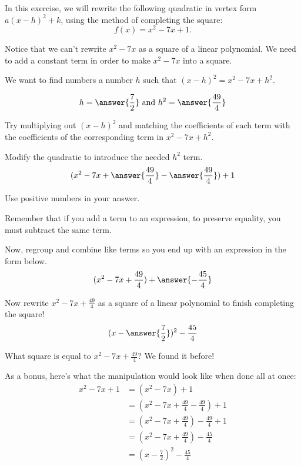 \documentclass{ximera}
\author{Kenneth Berglund}
\begin{document}
In this exercise, we will rewrite the following quadratic in vertex form $a(x - h)^2 + k$, using the method of completing the square:
\[
f(x)=x^2-7x+1.
\]

\begin{exercise}

Notice that we can't rewrite $x^2 - 7x$ as a square of a linear polynomial. We need to add a constant term in order to make $x^2 - 7x$ into a square. 

We want to find numbers a number $h$ such that $(x - h)^2 = x^2 - 7x + h^2$. 

$$
h = \answer{\frac{7}{2}} \text{ and } h^2 = \answer{\frac{49}{4}}
$$
\begin{hint}
Try multiplying out $(x - h)^2$ and matching the coefficients of each term with the coefficients of the corresponding term in $x^2 - 7x + h^2$. 
\end{hint}


\begin{exercise}
Modify the quadratic to introduce the needed $h^2$ term.
$$
(x^2 - 7x + \answer{\frac{49}{4}} - \answer{\frac{49}{4}}) + 1
$$ 

Use positive numbers in your answer.

\begin{hint}
Remember that if you add a term to an expression, to preserve equality, you must subtract the same term.
\end{hint}

\begin{exercise}
Now, regroup and combine like terms so you end up with an expression in the form below.
$$
(x^2-7x+\frac{49}{4}) + \answer{-\frac{45}{4}}
$$ 

\begin{exercise}
Now rewrite $x^2 - 7x + \frac{49}{4}$ as a square of a linear polynomial to finish completing the square!
$$
(x - \answer{\frac{7}{2}})^2 -\frac{45}{4}
$$ 
\begin{hint}
What square is equal to $x^2 - 7x + \frac{49}{4}$? We found it before!
\end{hint}

\begin{exercise}
As a bonus, here's what the manipulation would look like when done all at once:
\begin{align*}
x^2 - 7x + 1 & = (x^2 - 7x) + 1 \\
& = (x^2 - 7x + \frac{49}{4}- \frac{49}{4}) + 1 \\
& = (x^2-7x+\frac{49}{4})-\frac{49}{4} + 1\\
& = (x^2-7x+\frac{49}{4})-\frac{45}{4}\\
& = (x - \frac{7}{2})^2 - \frac{45}{4}
\end{align*}
\end{exercise}
\end{exercise}
\end{exercise}
\end{exercise}
\end{exercise}
\end{document}
